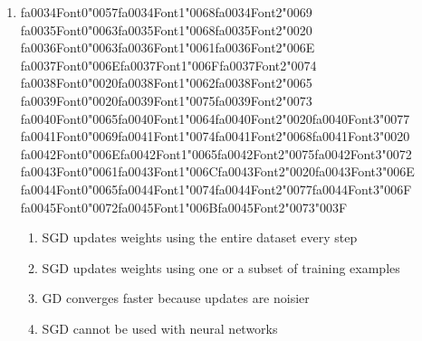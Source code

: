\documentclass[12pt]{article}
\begin{document}
\begin{enumerate}[label=Q\arabic*.]
\item {\csname fa0034Font0\endcsname\char"0057}{\csname fa0034Font1\endcsname\char"0068}{\csname fa0034Font2\endcsname\char"0069} {\csname fa0035Font0\endcsname\char"0063}{\csname fa0035Font1\endcsname\char"0068}{\csname fa0035Font2\endcsname\char"0020} {\csname fa0036Font0\endcsname\char"0063}{\csname fa0036Font1\endcsname\char"0061}{\csname fa0036Font2\endcsname\char"006E} {\csname fa0037Font0\endcsname\char"006E}{\csname fa0037Font1\endcsname\char"006F}{\csname fa0037Font2\endcsname\char"0074} {\csname fa0038Font0\endcsname\char"0020}{\csname fa0038Font1\endcsname\char"0062}{\csname fa0038Font2\endcsname\char"0065} {\csname fa0039Font0\endcsname\char"0020}{\csname fa0039Font1\endcsname\char"0075}{\csname fa0039Font2\endcsname\char"0073} {\csname fa0040Font0\endcsname\char"0065}{\csname fa0040Font1\endcsname\char"0064}{\csname fa0040Font2\endcsname\char"0020}{\csname fa0040Font3\endcsname\char"0077} {\csname fa0041Font0\endcsname\char"0069}{\csname fa0041Font1\endcsname\char"0074}{\csname fa0041Font2\endcsname\char"0068}{\csname fa0041Font3\endcsname\char"0020} {\csname fa0042Font0\endcsname\char"006E}{\csname fa0042Font1\endcsname\char"0065}{\csname fa0042Font2\endcsname\char"0075}{\csname fa0042Font3\endcsname\char"0072} {\csname fa0043Font0\endcsname\char"0061}{\csname fa0043Font1\endcsname\char"006C}{\csname fa0043Font2\endcsname\char"0020}{\csname fa0043Font3\endcsname\char"006E} {\csname fa0044Font0\endcsname\char"0065}{\csname fa0044Font1\endcsname\char"0074}{\csname fa0044Font2\endcsname\char"0077}{\csname fa0044Font3\endcsname\char"006F} {\csname fa0045Font0\endcsname\char"0072}{\csname fa0045Font1\endcsname\char"006B}{\csname fa0045Font2\endcsname\char"0073}{\char"003F}
\begin{enumerate}[label=(\Alph*)]
    \item SGD updates weights using the entire dataset every step
    \item SGD updates weights using one or a subset of training examples
    \item GD converges faster because updates are noisier
    \item SGD cannot be used with neural networks
\end{enumerate}

\end{enumerate}
\end{document}
